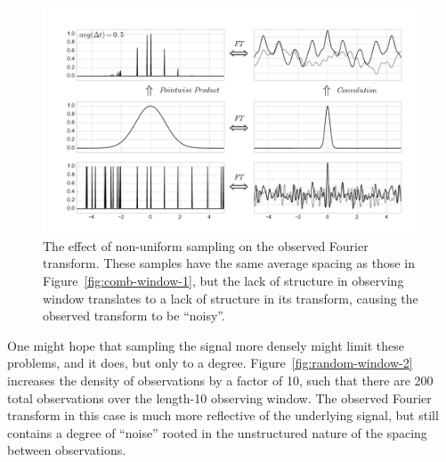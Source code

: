 \documentclass[preprint]{aastex}
\newcommand{\Fig}[1]{Figure~\ref{fig:#1}}
\newcommand{\fig}[1]{Figure~\ref{fig:#1}}
\newcommand{\figlabel}[1]{\label{fig:#1}}
\begin{document}
\begin{figure}[ht]
  \centering
  \includegraphics[width=\textwidth]{fig10_random_window}
  \caption{The effect of non-uniform sampling on the observed Fourier transform.
    These samples have the same average spacing as those in \fig{comb-window-1},
    but the lack of structure in observing window translates to a lack of
    structure in its transform, causing the observed transform to be ``noisy''.
    \figlabel{random-window}}
\end{figure}

One might hope that sampling the signal more densely might limit these problems,
and it does, but only to a degree.
\Fig{random-window-2} increases the density of observations by a factor of 10,
such that there are 200 total observations over the length-10 observing window.
The observed Fourier transform in this case is much more reflective of the
underlying signal, but still contains a degree of ``noise'' rooted in the
unstructured nature of the spacing between observations.
\end{document}

